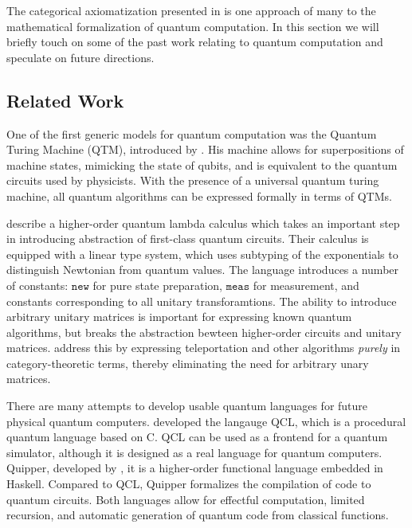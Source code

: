 The categorical axiomatization presented in  is one approach of many
to the mathematical formalization of quantum computation. In this section
we will briefly touch on some of the past work relating to quantum computation
and speculate on future directions.

\subsection{Related Work} 

One of the first generic models for quantum computation was the Quantum
Turing Machine (QTM), introduced by \cite{deutsch1985}. His machine allows for superpositions
of machine states, mimicking the state of qubits, and is equivalent to the
quantum circuits used by physicists. With the presence of a universal quantum turing
machine, all quantum algorithms can be expressed formally in terms of QTMs. 

\cite{selinger2006lambda,selinger2009quantum} describe a higher-order quantum lambda 
calculus which  takes an important step in introducing abstraction of first-class 
quantum circuits.
Their calculus is equipped with a linear type system, which uses subtyping of the
exponentials to distinguish Newtonian from quantum values. The language introduces
a number of constants: $\texttt{new}$ for pure state preparation,
$\texttt{meas}$ for measurement, and constants corresponding to all unitary
transforamtions. The ability to introduce arbitrary unitary matrices is
important for expressing known quantum algorithms, but breaks the abstraction 
bewteen higher-order circuits and unitary matrices. \cite{abramsky2009categorical}
address this by expressing teleportation and other algorithms \emph{purely} in
category-theoretic terms, thereby eliminating the need for arbitrary unary matrices.

There are many attempts to develop usable quantum languages for future physical quantum
computers. \cite{omer2000quantum} developed the langauge QCL, which is a procedural
quantum language based on C. QCL can be used as a frontend for a quantum simulator,
although it is designed as a real language for quantum computers. Quipper,
developed by \cite{green13quipper}, 
it is a higher-order functional language embedded in Haskell. Compared to QCL,
Quipper formalizes the compilation of code to quantum circuits.
Both languages allow for effectful computation, limited recursion, and automatic
generation of quantum code from classical functions.

